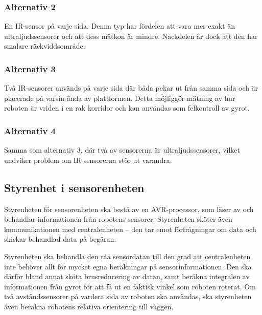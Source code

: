 \documentclass[a4paper,titlepage,12pt]{article}
\begin{document}
	\subsubsection{Alternativ 2}

	En IR-sensor på varje sida. Denna typ har fördelen att vara mer exakt
	än ultraljudssensorer och att dess mätkon är mindre.
	Nackdelen är dock att den har smalare räckviddsområde.

	\subsubsection{Alternativ 3}

	Två IR-sensorer används på varje sida där båda pekar ut från samma sida och
	är placerade på varsin ända av plattformen. Detta möjliggör mätning av hur
	roboten är vriden i en rak korridor och kan användas som felkontroll av
	gyrot.

	\subsubsection{Alternativ 4}

	Samma som alternativ 3, där två av sensorerna är ultraljudssensorer, vilket undviker
	problem om IR-sensorerna stör ut varandra.

	\subsection{Styrenhet i sensorenheten}

	Styrenheten för sensorenheten ska bestå av en AVR-processor, som läser av och behandlar
	informationen från robotens sensorer. Styrenheten sköter även
	kommunikationen med centralenheten -- den tar emot förfrågningar om data och
	skickar behandlad data på begäran.

	Styrenheten ska behandla den råa sensordatan till den grad att
	centralenheten inte behöver allt för mycket egna beräkningar på
	sensorinformationen. Den ska därför bland annat sköta brusreducering av
	datan, samt beräkna integralen av informationen från gyrot för att få ut en
	faktisk vinkel som roboten roterat. Om två avståndssensorer på vardera sida
	av roboten ska användas, ska styrenheten även beräkna robotens relativa
	orientering till väggen.
	

	\newpage{}
\end{document}
